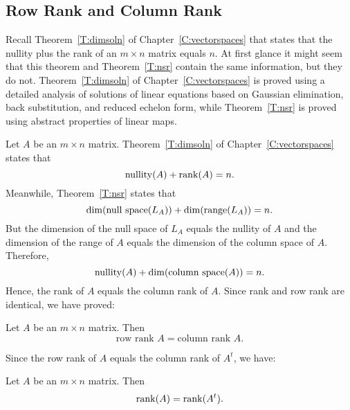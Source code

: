 \documentclass{ximera}
\begin{document}
\subsection*{Row Rank and Column Rank}

Recall Theorem~\ref{T:dimsoln} of Chapter~\ref{C:vectorspaces} that states
that the nullity plus the rank of an $m\times n$ matrix equals $n$.  At first 
glance it might seem that this theorem and Theorem~\ref{T:nsr} contain the 
same information, but they do not.  Theorem~\ref{T:dimsoln} of 
Chapter~\ref{C:vectorspaces} is proved using a detailed analysis of solutions 
of linear equations based on Gaussian elimination, back substitution, and 
reduced echelon form, while Theorem~\ref{T:nsr} is proved using abstract 
properties of linear maps.

Let $A$ be an $m\times n$ matrix.  Theorem~\ref{T:dimsoln} of
Chapter~\ref{C:vectorspaces} states that 
\[
{\rm nullity}(A) + {\rm rank}(A) = n.
\]
Meanwhile, Theorem~\ref{T:nsr} states that 
\[
\dim(\mbox{\rm null space}(L_A)) + \dim({\rm range}(L_A)) = n.
\]
But the dimension of the null space of $L_A$ equals the nullity of $A$ 
and the dimension of the range of $A$ equals the dimension of the column 
space of $A$.  Therefore, 
\[
{\rm nullity}(A) + \dim(\mbox{column space}(A)) = n.
\]
Hence, the rank of $A$ equals the column rank of $A$.  Since rank and row rank 
are identical, we have proved:
\begin{theorem} \label{T:rowrank=columnrank}
Let $A$ be an $m\times n$ matrix.  Then
\[
\mbox{row rank } A=\mbox{column rank } A.
\]
\end{theorem}

Since the row rank of $A$ equals the column rank of $A^t$, we have:
\begin{corollary}
Let $A$ be an $m\times n$ matrix.  Then
\[
{\rm rank}(A) = {\rm rank}(A^t).
\]
\end{corollary}


\EXER

\TEXER
\end{document}
